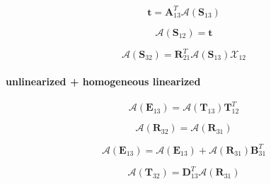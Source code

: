 \begin{equation}
\mathbf{t} = \mathbf{A}^{T}_{13}\mathcal{A}(\mathbf{S}_{13})
\label{eq:adding-downward-adjoint_of_tangent_linear-particular_linearized_p_particular_linearized-t}
\end{equation}

\begin{equation}
\mathcal{A}(\mathbf{S}_{12}) = \mathbf{t}
\label{eq:adding-downward-adjoint_of_tangent_linear-particular_linearized_p_particular_linearized-S12_a}
\end{equation}

\begin{equation}
\mathcal{A}(\mathbf{S}_{32}) = \mathbf{R}^{T}_{21}\mathcal{A}(\mathbf{S}_{13})\mathcal{X}_{12}
\label{eq:adding-downward-adjoint_of_tangent_linear-particular_linearized_p_particular_linearized-S32_a}
\end{equation}


\paragraph{unlinearized + homogeneous linearized}
\label{sec:adding-downward-adjoint_of_tangent_linear-unlinearized_p_homogeneous_linearized}

\begin{equation}
\mathcal{A}(\mathbf{E}_{13}) = \mathcal{A}(\mathbf{T}_{13})\mathbf{T}^{T}_{12}
\label{eq:adding-downward-adjoint_of_tangent_linear-unlinearized_p_homogeneous_linearized-E13_a}
\end{equation}

\begin{equation}
\mathcal{A}(\mathbf{R}_{32}) = \mathcal{A}(\mathbf{R}_{31})
\label{eq:adding-downward-adjoint_of_tangent_linear-unlinearized_p_homogeneous_linearized-U31_a}
\end{equation}

\begin{equation}
\mathcal{A}(\mathbf{E}_{13}) = \mathcal{A}(\mathbf{E}_{13}) + \mathcal{A}(\mathbf{R}_{31})\mathbf{B}^{T}_{31}
\label{eq:adding-downward-adjoint_of_tangent_linear-unlinearized_p_homogeneous_linearized-E13_a2}
\end{equation}

\begin{equation}
\mathcal{A}(\mathbf{T}_{32}) = \mathbf{D}^{T}_{13}\mathcal{A}(\mathbf{R}_{31})
\label{eq:adding-downward-adjoint_of_tangent_linear-unlinearized_p_homogeneous_linearized-T32_a}
\end{equation}


